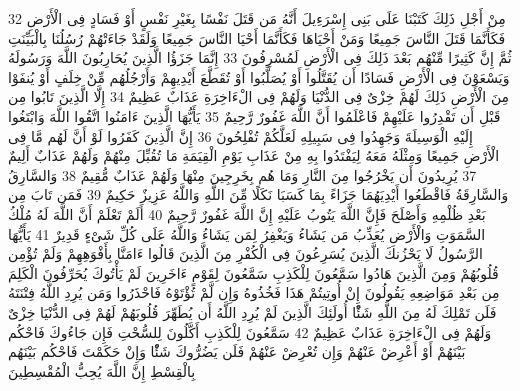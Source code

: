 \documentclass[20pt,a4paper]{article}
\begin{document}
{\tiny\colorbox{cl_aya}{32}} مِنْ أَجْلِ ذَلِكَ كَتَبْنَا عَلَى بَنِى إِسْرَءِيلَ أَنَّهُ مَن قَتَلَ نَفْسًا بِغَيْرِ نَفْسٍ أَوْ فَسَادٍ فِى الْأَرْضِ فَكَأَنَّمَا قَتَلَ النَّاسَ جَمِيعًا وَمَنْ أَحْيَاهَا فَكَأَنَّمَا أَحْيَا النَّاسَ جَمِيعًا وَلَقَدْ جَاءَتْهُمْ رُسُلُنَا بِالْبَيِّنَتِ ثُمَّ إِنَّ كَثِيرًا مِّنْهُم بَعْدَ ذَلِكَ فِى الْأَرْضِ لَمُسْرِفُونَ
{\tiny\colorbox{cl_aya}{33}} إِنَّمَا جَزَؤُا الَّذِينَ يُحَارِبُونَ اللَّهَ وَرَسُولَهُ وَيَسْعَوْنَ فِى الْأَرْضِ فَسَادًا أَن يُقَتَّلُوا أَوْ يُصَلَّبُوا أَوْ تُقَطَّعَ أَيْدِيهِمْ وَأَرْجُلُهُم مِّنْ خِلَفٍ أَوْ يُنفَوْا مِنَ الْأَرْضِ ذَلِكَ لَهُمْ خِزْىٌ فِى الدُّنْيَا وَلَهُمْ فِى الْءَاخِرَةِ عَذَابٌ عَظِيمٌ
{\tiny\colorbox{cl_aya}{34}} إِلَّا الَّذِينَ تَابُوا مِن قَبْلِ أَن تَقْدِرُوا عَلَيْهِمْ فَاعْلَمُوا أَنَّ اللَّهَ غَفُورٌ رَّحِيمٌ
{\tiny\colorbox{cl_aya}{35}} يَأَيُّهَا الَّذِينَ ءَامَنُوا اتَّقُوا اللَّهَ وَابْتَغُوا إِلَيْهِ الْوَسِيلَةَ وَجَهِدُوا فِى سَبِيلِهِ لَعَلَّكُمْ تُفْلِحُونَ
{\tiny\colorbox{cl_aya}{36}} إِنَّ الَّذِينَ كَفَرُوا لَوْ أَنَّ لَهُم مَّا فِى الْأَرْضِ جَمِيعًا وَمِثْلَهُ مَعَهُ لِيَفْتَدُوا بِهِ مِنْ عَذَابِ يَوْمِ الْقِيَمَةِ مَا تُقُبِّلَ مِنْهُمْ وَلَهُمْ عَذَابٌ أَلِيمٌ
{\tiny\colorbox{cl_aya}{37}} يُرِيدُونَ أَن يَخْرُجُوا مِنَ النَّارِ وَمَا هُم بِخَرِجِينَ مِنْهَا وَلَهُمْ عَذَابٌ مُّقِيمٌ
{\tiny\colorbox{cl_aya}{38}} وَالسَّارِقُ وَالسَّارِقَةُ فَاقْطَعُوا أَيْدِيَهُمَا جَزَاءً بِمَا كَسَبَا نَكَلًا مِّنَ اللَّهِ وَاللَّهُ عَزِيزٌ حَكِيمٌ
{\tiny\colorbox{cl_aya}{39}} فَمَن تَابَ مِن بَعْدِ ظُلْمِهِ وَأَصْلَحَ فَإِنَّ اللَّهَ يَتُوبُ عَلَيْهِ إِنَّ اللَّهَ غَفُورٌ رَّحِيمٌ
{\tiny\colorbox{cl_aya}{40}} أَلَمْ تَعْلَمْ أَنَّ اللَّهَ لَهُ مُلْكُ السَّمَوَتِ وَالْأَرْضِ يُعَذِّبُ مَن يَشَاءُ وَيَغْفِرُ لِمَن يَشَاءُ وَاللَّهُ عَلَى كُلِّ شَىْءٍ قَدِيرٌ
{\tiny\colorbox{cl_aya}{41}} يَأَيُّهَا الرَّسُولُ لَا يَحْزُنكَ الَّذِينَ يُسَرِعُونَ فِى الْكُفْرِ مِنَ الَّذِينَ قَالُوا ءَامَنَّا بِأَفْوَهِهِمْ وَلَمْ تُؤْمِن قُلُوبُهُمْ وَمِنَ الَّذِينَ هَادُوا سَمَّعُونَ لِلْكَذِبِ سَمَّعُونَ لِقَوْمٍ ءَاخَرِينَ لَمْ يَأْتُوكَ يُحَرِّفُونَ الْكَلِمَ مِن بَعْدِ مَوَاضِعِهِ يَقُولُونَ إِنْ أُوتِيتُمْ هَذَا فَخُذُوهُ وَإِن لَّمْ تُؤْتَوْهُ فَاحْذَرُوا وَمَن يُرِدِ اللَّهُ فِتْنَتَهُ فَلَن تَمْلِكَ لَهُ مِنَ اللَّهِ شَئًْا أُولَئِكَ الَّذِينَ لَمْ يُرِدِ اللَّهُ أَن يُطَهِّرَ قُلُوبَهُمْ لَهُمْ فِى الدُّنْيَا خِزْىٌ وَلَهُمْ فِى الْءَاخِرَةِ عَذَابٌ عَظِيمٌ
{\tiny\colorbox{cl_aya}{42}} سَمَّعُونَ لِلْكَذِبِ أَكَّلُونَ لِلسُّحْتِ فَإِن جَاءُوكَ فَاحْكُم بَيْنَهُمْ أَوْ أَعْرِضْ عَنْهُمْ وَإِن تُعْرِضْ عَنْهُمْ فَلَن يَضُرُّوكَ شَئًْا وَإِنْ حَكَمْتَ فَاحْكُم بَيْنَهُم بِالْقِسْطِ إِنَّ اللَّهَ يُحِبُّ الْمُقْسِطِينَ
\end{document}
